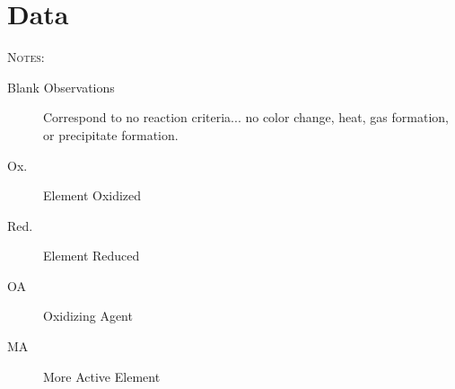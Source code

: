 \documentclass[fleqn,titlepage]{article}
\begin{document}
\section*{Data}
\textsc{Notes:}
\begin{description}
  \item[Blank Observations] Correspond to no reaction criteria... no color change, heat, gas formation, or precipitate formation.\\[-.5cm]
  \item[Ox.] Element Oxidized\\[-.5cm]
  \item[Red.] Element Reduced\\[-.5cm]
  \item[OA] Oxidizing Agent
  \item[MA] More Active Element
\end{description}
\end{document}
